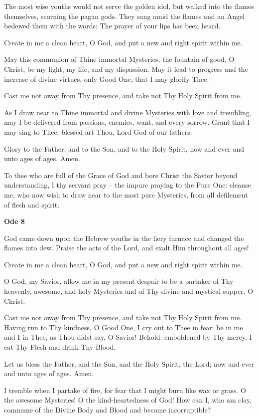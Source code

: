 \begin{hang}
\noindent{}The most wise youths would not serve the golden idol, but walked into the flames themselves, scorning the pagan gods. They sang amid the flames and an Angel bedewed them with the words: The prayer of your lips has been heard.

Create in me a clean heart, O God, and put a new and right spirit within me.

May this communion of Thine immortal Mysteries, the fountain of good, O Christ, be my light, my life, and my dispassion. May it lead to progress and the increase of divine virtues, only Good One, that I may glorify Thee.

Cast me not away from Thy presence, and take not Thy Holy Spirit from me.

As I draw near to Thine immortal and divine Mysteries with love and trembling, may I be delivered from passions, enemies, want, and every sorrow. Grant that I may sing to Thee: blessed art Thou, Lord God of our fathers.

Glory to the Father, and to the Son, and to the Holy Spirit, now and ever and unto ages of ages. Amen.

To thee who are full of the Grace of God and bore Christ the Savior beyond understanding, I thy servant pray -- the impure praying to the Pure One: cleanse me, who now wish to draw near to the most pure Mysteries, from all defilement of flesh and spirit.

\end{hang}

\begin{center}
	\textbf{Ode 8}
\end{center}

\begin{hang}
\noindent{}God came down upon the Hebrew youths in the fiery furnace and changed the flames into dew. Praise the acts of the Lord, and exalt Him throughout all ages!

Create in me a clean heart, O God, and put a new and right spirit within me.

O God, my Savior, allow me in my present despair to be a partaker of Thy heavenly, awesome, and holy Mysteries and of Thy divine and mystical supper, O Christ.

Cast me not away from Thy presence, and take not Thy Holy Spirit from me. Having run to Thy kindness, O Good One, I cry out to Thee in fear: be in me and I in Thee, as Thou didst say, O Savior! Behold: emboldened by Thy mercy, I eat Thy Flesh and drink Thy Blood.

Let us bless the Father, and the Son, and the Holy Spirit, the Lord; now and ever and unto ages of ages. Amen.

I tremble when I partake of fire, for fear that I might burn like wax or grass. O the awesome Mysteries! O the kind-heartedness of God! How can I, who am clay, commune of the Divine Body and Blood and become incorruptible?

\end{hang}

